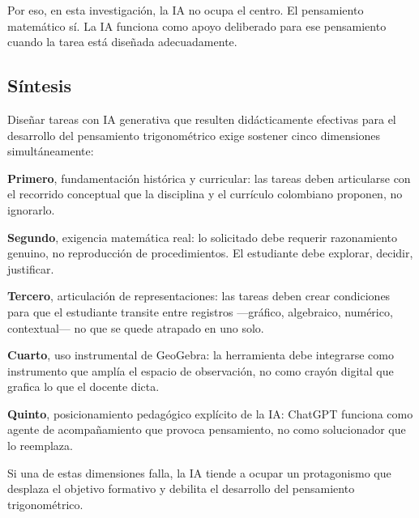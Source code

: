 Por eso, en esta investigación, la IA no ocupa el centro. El pensamiento matemático sí. La IA funciona como apoyo deliberado para ese pensamiento cuando la tarea está diseñada adecuadamente.

\subsection{Síntesis}

Diseñar tareas con IA generativa que resulten didácticamente efectivas para el desarrollo del pensamiento trigonométrico exige sostener cinco dimensiones simultáneamente:

\textbf{Primero}, fundamentación histórica y curricular: las tareas deben articularse con el recorrido conceptual que la disciplina y el currículo colombiano proponen, no ignorarlo.

\textbf{Segundo}, exigencia matemática real: lo solicitado debe requerir razonamiento genuino, no reproducción de procedimientos. El estudiante debe explorar, decidir, justificar.

\textbf{Tercero}, articulación de representaciones: las tareas deben crear condiciones para que el estudiante transite entre registros —gráfico, algebraico, numérico, contextual— no que se quede atrapado en uno solo.

\textbf{Cuarto}, uso instrumental de GeoGebra: la herramienta debe integrarse como instrumento que amplía el espacio de observación, no como crayón digital que grafica lo que el docente dicta.

\textbf{Quinto}, posicionamiento pedagógico explícito de la IA: ChatGPT funciona como agente de acompañamiento que provoca pensamiento, no como solucionador que lo reemplaza.

Si una de estas dimensiones falla, la IA tiende a ocupar un protagonismo que desplaza el objetivo formativo y debilita el desarrollo del pensamiento trigonométrico.
